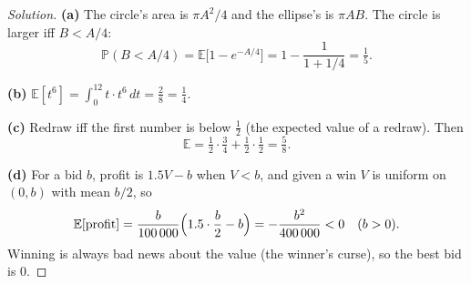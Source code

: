 \documentclass[11pt]{article}
\theoremstyle{definition}
\newcommand{\E}{\mathbb{E}}
\begin{document}
\begin{proof}[Solution]
\textbf{(a)} The circle's area is $\pi A^2/4$ and the ellipse's is $\pi AB$. The circle is larger iff $B<A/4$:
\[
\mathbb P(B<A/4)=\E\bigl[1-e^{-A/4}\bigr]=1-\frac1{1+1/4}=\boxed{\tfrac15}.
\]

\textbf{(b)} $\E[t^6]=\int_0^12t\cdot t^6\,dt=\tfrac28=\boxed{\tfrac14}$.

\textbf{(c)} Redraw iff the first number is below $\tfrac12$ (the expected value of a redraw). Then
\[
\E=\tfrac12\cdot\tfrac34+\tfrac12\cdot\tfrac12=\boxed{\tfrac58}.
\]

\textbf{(d)} For a bid $b$, profit is $1.5V-b$ when $V<b$, and given a win $V$ is uniform on $(0,b)$ with mean $b/2$, so
\[
\E[\text{profit}]=\frac{b}{100\,000}\Bigl(1.5\cdot\frac b2-b\Bigr)=-\frac{b^2}{400\,000}<0\quad(b>0).
\]
Winning is always bad news about the value (the winner's curse), so the best bid is $\boxed{0}$.
\end{proof}
\end{document}
